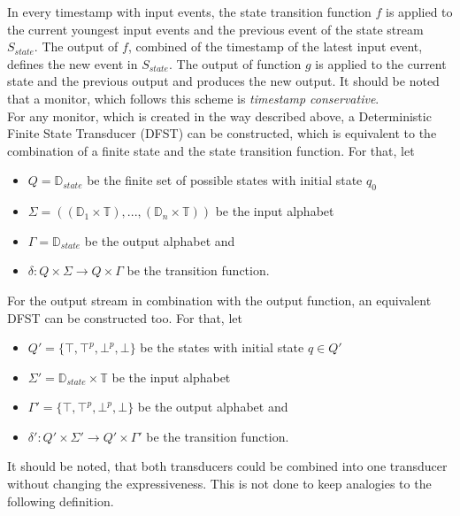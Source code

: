 		In every timestamp with input events, the state transition function $f$ is applied to the current youngest input events and the previous event of the state stream $S_{state}$. The output of $f$, combined of the timestamp of the latest input event, defines the new event in $S_{state}$. The output of function $g$ is applied to the current state and the previous output and produces the new output. It should be noted that a monitor, which follows this scheme is \textit{timestamp conservative}.\\
		For any monitor, which is created in the way described above, a Deterministic Finite State Transducer (DFST) can be constructed, which is equivalent to the combination of a finite state and the state transition function. For that, let
		\begin{itemize}
			\item
			$Q=\mathbb{D}_{state}$ be the finite set of possible states with initial state $q_0$
			\item
			$\Sigma=((\mathbb{D}_1\times \mathbb{T}),...,(\mathbb{D}_n\times \mathbb{T}))$ be the input alphabet
			\item
			$\Gamma = \mathbb D_{state}$ be the output alphabet and
			\item
			$\delta: Q\times \Sigma\rightarrow Q\times\Gamma$ be the transition function.
		\end{itemize}
		For the output stream in combination with the output function, an equivalent DFST can be constructed too. For that, let
		\begin{itemize}
			\item
				$Q' = \{\top, \top^p, \bot^p, \bot\}$ be the states with initial state $q\in Q'$
			\item
				$\Sigma'=\mathbb D_{state}\times \mathbb{T}$ be the input alphabet
			\item
				$\Gamma' = \{\top, \top^p, \bot^p, \bot\}$ be the output alphabet and
			\item
				$\delta': Q'\times \Sigma'\rightarrow Q'\times\Gamma'$ be the transition function.
		\end{itemize}
		It should be noted, that both transducers could be combined into one transducer without changing the expressiveness. This is not done to keep analogies to the following definition.
